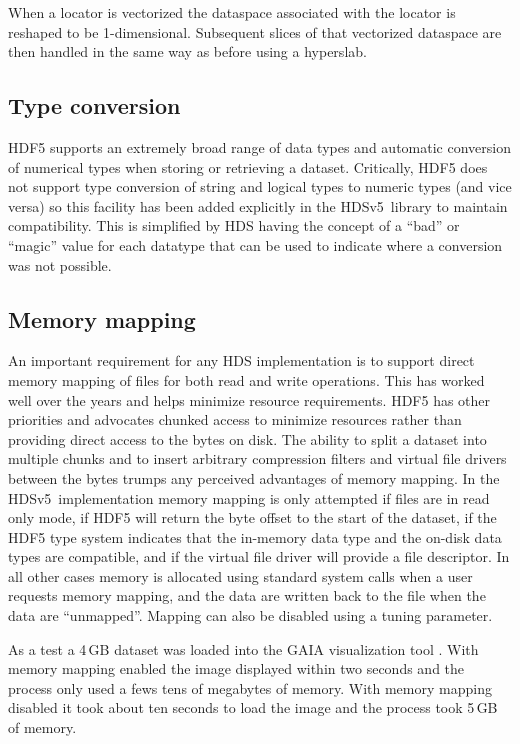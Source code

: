 \documentclass[final,authoryear,5p,times,twocolumn]{elsarticle}
\newcommand{\new}{HDSv5}
\begin{document}
When a locator is vectorized the dataspace associated with the locator
is reshaped to be 1-dimensional. Subsequent slices of that vectorized
dataspace are then handled in the same way as before using a hyperslab.

\subsection{Type conversion}

HDF5 supports an extremely broad range of data types and automatic
conversion of numerical types when storing or retrieving a
dataset. Critically, HDF5 does not support type conversion of string
and logical types to numeric types (and vice versa) so this facility
has been added explicitly in the \new\ library to maintain
compatibility. This is simplified by HDS having the concept of a
``bad'' or ``magic'' value for each datatype that can be used to
indicate where a conversion was not possible.

\subsection{Memory mapping}

An important requirement for any HDS implementation is to
support direct memory mapping of files for both read and write
operations. This has worked well over the years and helps minimize
resource requirements. HDF5 has other priorities and advocates chunked
access to minimize resources rather than providing direct access to
the bytes on disk. The ability to split a dataset into multiple chunks
and to insert arbitrary compression filters and virtual file drivers
between the bytes trumps any perceived advantages of memory
mapping. In the \new\ implementation memory mapping is only attempted
if files are in read only mode, if HDF5 will return the byte offset to
the start of the dataset, if the HDF5 type system indicates that the
in-memory data type and the on-disk data types are compatible, and if
the virtual file driver will provide a file descriptor. In all other
cases memory is allocated using standard system calls when a user
requests memory mapping, and the data are written back to the file
when the data are ``unmapped''. Mapping can also be disabled using a
tuning parameter.

As a test a 4\,GB dataset was loaded into the GAIA visualization tool
\citep[][]{2009ASPC..411..575D}. With memory mapping enabled
the image displayed within two seconds and the process only used a
fews tens of megabytes of memory. With memory mapping disabled it took
about ten seconds to load the image and the process took 5\,GB of
memory.
\end{document}
